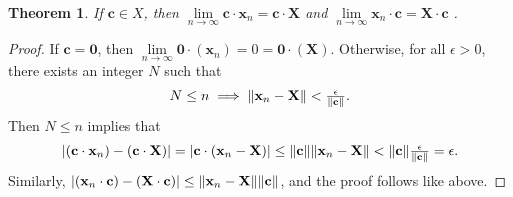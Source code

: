 \documentclass[11pt]{article}
\renewcommand{\vec}[1]{\mathbf{#1}}
\newtheorem{theorem}{Theorem}
\begin{document}
\begin{theorem}
	If $\vec{c} \in X$, then $\lim\limits_{n \to \infty} \vec{c} \cdot \vec{x}_{n} = \vec{c} \cdot \vec{X}$ and $\lim\limits_{n \to \infty} \vec{x}_{n} \cdot \vec{c} = \vec{X} \cdot \vec{c}$ .
\end{theorem}
\begin{adjustwidth}{0.5cm}{}
	\begin{proof}
		If $\vec{c} = \vec{0}$, then $\lim\limits_{n \to \infty} \vec{0} \cdot (\vec{x}_{n}) = 0 = \vec{0} \cdot (\vec{X})$. Otherwise, for all $\epsilon > 0$, there exists an integer $N$ such that
		\[
			N \le n \implies \norm{\vec{x}_{n} - \vec{X}} < \tfrac{\epsilon}{\norm{\vec{c}}}.
		\]
		Then $N \le n$ implies that
		\[
			\abs{(\vec{c} \cdot \vec{x}_{n}) - (\vec{c} \cdot \vec{X})} = \abs{\vec{c} \cdot (\vec{x}_{n} - \vec{X})} \le \norm{\vec{c}} \norm{\vec{x}_{n} - \vec{X}} < \norm{\vec{c}} \tfrac{\epsilon}{\norm{\vec{c}}} = \epsilon.
		\]
		Similarly, $\abs{(\vec{x}_{n} \cdot \vec{c}) - (\vec{X} \cdot \vec{c})} \le \norm{\vec{x}_{n} - \vec{X}} \norm{\vec{c}}$, and the proof
		follows like above.
	\end{proof}
\end{adjustwidth}

\newpage
\end{document}
